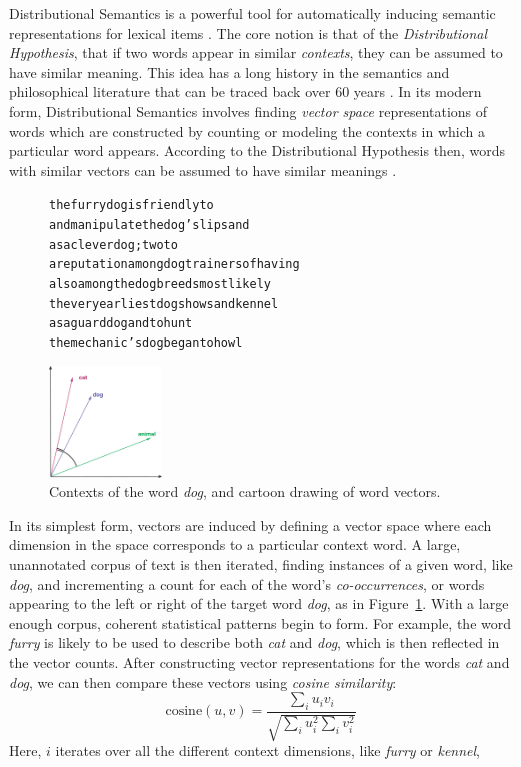 \documentclass[letterpaper]{article}
\begin{document}
Distributional Semantics is a powerful tool for automatically inducing semantic
representations for lexical items \cite{turney:2010:jair,erk:2012:llc}.  The
core notion is that of the {\em Distributional Hypothesis}, that if two words
appear in similar {\em contexts}, they can be assumed to have similar meaning.
This idea has a long history in the semantics and philosophical literature that
can be traced back over 60 years
\cite{wittgenstein:1953:pi,harris:1954:word,firth:1957:la}. In its modern form,
Distributional Semantics involves finding {\em vector space} representations of
words which are constructed by counting or modeling the contexts in which a
particular word appears. According to the Distributional Hypothesis then, words
with similar vectors can be assumed to have similar meanings
\cite{turney:2010:jair}.

\begin{figure}
\centering
\begin{minipage}{7cm}
\begin{scriptsize}
\begin{alltt}
         the furry {dog} is friendly to
and manipulate the {dog} 's lips and
       as a clever {dog} ; two to
a reputation among {dog} trainers of having
    also among the {dog} breeds most likely
 the very earliest {dog} shows and kennel
        as a guard {dog} and to hunt
   the mechanic 's {dog} began to howl
\end{alltt}
\end{scriptsize}
\end{minipage}\qquad
\begin{minipage}{3cm}
\includegraphics[width=3cm]{figures/vectors}
\end{minipage}
\caption{Contexts of the word {\em dog}, and cartoon drawing
of word vectors.}
\label{fig:vsm}
\end{figure}

In its simplest form, vectors are induced by defining a vector space where
each dimension in the space corresponds to a particular context word. A large,
unannotated corpus of text is then iterated, finding instances of a given word,
like {\em dog}, and incrementing a count for each of the word's {\em
co-occurrences}, or words appearing to the left or right of the target word
{\em dog}, as in Figure~\ref{fig:vsm}. With a large enough corpus, coherent
statistical patterns begin to form. For example, the word {\em furry} is likely
to be used to describe both {\em cat} and {\em dog}, which is then reflected in
the vector counts. After constructing vector representations for the words {\em
cat} and {\em dog}, we can then compare these vectors using {\em cosine
similarity}:
\begin{equation*}
  \text{cosine}(u, v) = \frac{\sum_i u_iv_i}{\sqrt{\sum_i u_i^2 \sum_i v_i^2}}
\end{equation*}
Here, $i$ iterates over all the different context dimensions, like {\em furry}
or {\em kennel}, 
\end{document}
